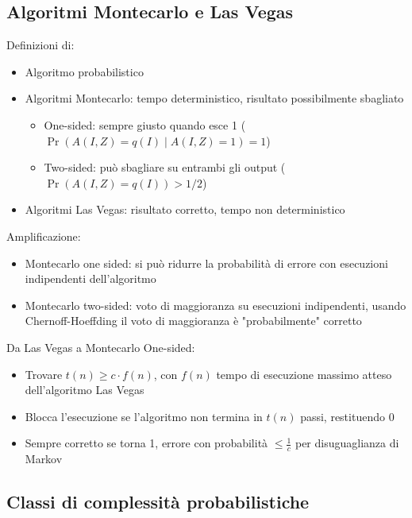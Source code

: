 
\subsection{Algoritmi Montecarlo e Las Vegas}

Definizioni di:
\begin{itemize}
	\item Algoritmo probabilistico

	\item Algoritmi Montecarlo: tempo deterministico, risultato possibilmente sbagliato
	\begin{itemize}
		\item One-sided: sempre giusto quando esce 1 ($\Pr(A(I,Z) = q(I) \mid A(I,Z) = 1) = 1$)

		\item Two-sided: può sbagliare su entrambi gli output ($\Pr (A(I,Z) = q(I)) > 1/2$)
	\end{itemize}

	\item Algoritmi Las Vegas: risultato corretto, tempo non deterministico
\end{itemize}

Amplificazione:
\begin{itemize}
	\item Montecarlo one sided: si può ridurre la probabilità di errore con esecuzioni indipendenti dell'algoritmo

	\item Montecarlo two-sided: voto di maggioranza su esecuzioni indipendenti, usando Chernoff-Hoeffding il voto di maggioranza è "probabilmente" corretto
\end{itemize}

Da Las Vegas a Montecarlo One-sided:
\begin{itemize}
	\item Trovare $t(n) \geq c \cdot f(n)$, con $f(n)$ tempo di esecuzione massimo atteso dell'algoritmo Las Vegas

	\item Blocca l'esecuzione se l'algoritmo non termina in $t(n)$ passi, restituendo 0

	\item Sempre corretto se torna 1, errore con probabilità $\leq \frac{1}{c}$ per disuguaglianza di Markov
\end{itemize}

\subsection{Classi di complessità probabilistiche}

